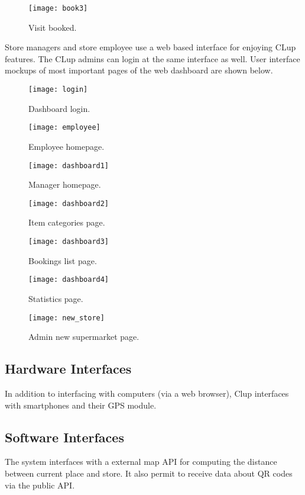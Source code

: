 \clearpage

\begin{figure}[H]
	\centering
	\texttt{[image: book3]}
	\caption{Visit booked.}	
\end{figure} 

Store managers and store employee use a web based interface for enjoying CLup features. The CLup admins can login at the same interface as well.
User interface mockups of most important pages of the web dashboard are shown below.
\vspace{2em}
\begin{figure}[H]
	\centering
	\texttt{[image: login]}
	\caption{Dashboard login.}	
\end{figure} 

\begin{figure}[H]
	\centering
	\texttt{[image: employee]}
	\caption{Employee homepage.}	
\end{figure} 
\begin{figure}[H]
	\centering
	\texttt{[image: dashboard1]}
	\caption{Manager homepage.}	
\end{figure} 
\begin{figure}[H]
	\centering
	\texttt{[image: dashboard2]}
	\caption{Item categories page.}	
\end{figure} 
\begin{figure}[H]
	\centering
	\texttt{[image: dashboard3]}
	\caption{Bookings list page.}	
\end{figure} 
\begin{figure}[H]
	\centering
	\texttt{[image: dashboard4]}
	\caption{Statistics page.}	
\end{figure} 
\begin{figure}[H]
	\centering
	\texttt{[image: new\_store]}
	\caption{Admin new supermarket page.}	
\end{figure} 
\clearpage

\subsection{Hardware Interfaces}
In addition to interfacing with computers (via a web browser), Clup interfaces with smartphones and their GPS module.
\subsection{Software Interfaces}
The system interfaces with a external map API for computing the distance between current place and store. It also permit to receive data
about QR codes via the public API.
